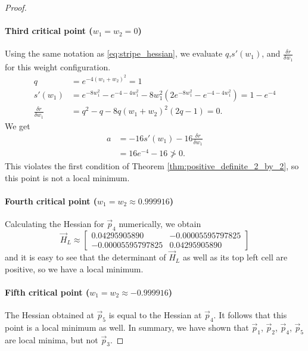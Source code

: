 \begin{proof}
    \paragraph{Third critical point ($w_1=w_2=0$)}
    Using the same notation as \ref{eq:stripe_hessian}, we evaluate 
    $q$,$s'(w_1)$, and $\frac{\delta r}{\delta w_1}$ for this weight configuration.
    \begin{align*}
        q &= e^{-4(w_1+w_2)^2} = 1 \\
        s'(w_1) &= e^{-8 w_1^2} - e^{-4 - 4 w_1^2} - 8 w_1^2 \left(2 e^{-8 w_1^2} - e^{-4-4 w_1^2}\right) = 1 - e^{-4} \\
        \frac{\delta r}{\delta w_1} &= q^2 - q - 8q(w_1 + w_2)^2 (2q - 1) = 0.
    \end{align*}
    We get
    \begin{align*}
        a &= -16s'(w_1) - 16 \frac{\delta r}{\delta w_1} \\
        &= 16 e^{-4} - 16 \ngtr 0.
    \end{align*}
    This violates the first condition of Theorem \ref{thm:positive_definite_2_by_2}, so this point is not a local minimum.
    
    \paragraph{Fourth critical point ($w_1=w_2\approx0.999916$)}
    Calculating the Hessian for $\vec{p}_4$ numerically, we obtain
    \begin{equation*}
        \vec{H}_L \approx \begin{bmatrix}
            0.04295905890 & -0.00005595797825 \\
            -0.00005595797825 & 0.04295905890
        \end{bmatrix}
    \end{equation*}
    and it is easy to see that the determinant of $\vec{H}_L$ as well as its top left cell are positive, so we have a local minimum.

    \paragraph{Fifth critical point ($w_1=w_2\approx-0.999916$)}
    The Hessian obtained at $\vec{p}_5$ is equal to the Hessian at $\vec{p}_4$. 
    It follows that this point is a local minimum as well.
    In summary, we have shown that $\vec{p}_1$, $\vec{p}_2$, $\vec{p}_4$, $\vec{p}_5$ are local minima, but not $\vec{p}_3$.
\end{proof}

